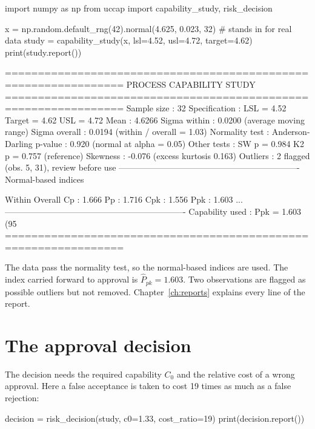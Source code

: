 \documentclass[a4paper,11pt,oneside,openany,parskip=half-,headings=standardclasses,toc=flat,numbers=noenddot]{scrbook}
\newcommand{\chapref}[1]{Chapter~\ref{#1}}
\newcommand{\Ppkhat}{\widehat{P}_{pk}}
\begin{document}
\begin{pycode}
import numpy as np
from uccap import capability_study, risk_decision

x = np.random.default_rng(42).normal(4.625, 0.023, 32)   # stands in for real data
study = capability_study(x, lsl=4.52, usl=4.72, target=4.62)
print(study.report())
\end{pycode}

\begin{outbox}
================================================================
  PROCESS CAPABILITY STUDY
================================================================
         Sample size : 32
       Specification : LSL = 4.52   Target = 4.62   USL = 4.72
                Mean : 4.6266
        Sigma within : 0.0200   (average moving range)
       Sigma overall : 0.0194   (within / overall = 1.03)
      Normality test : Anderson-Darling
             p-value : 0.920   (normal at alpha = 0.05)
         Other tests : SW p = 0.984   K2 p = 0.757   (reference)
            Skewness : -0.076   (excess kurtosis 0.163)
            Outliers : 2 flagged (obs. 5, 31), review before use
----------------------------------------------------------------
  Normal-based indices

              Within              Overall
                  Cp :  1.666          Pp :  1.716
                 Cpk :  1.556         Ppk :  1.603
...
----------------------------------------------------------------
     Capability used : Ppk = 1.603   (95%
================================================================
\end{outbox}

The data pass the normality test, so the normal-based indices are used. The index carried forward to
approval is $\Ppkhat = 1.603$. Two observations are flagged as possible outliers but not removed.
\chapref{ch:reports} explains every line of the report.

\section{The approval decision}

The decision needs the required capability $C_0$ and the relative cost of a wrong approval. Here a
false acceptance is taken to cost 19 times as much as a false rejection:

\begin{pycode}
decision = risk_decision(study, c0=1.33, cost_ratio=19)
print(decision.report())
\end{pycode}
\end{document}
